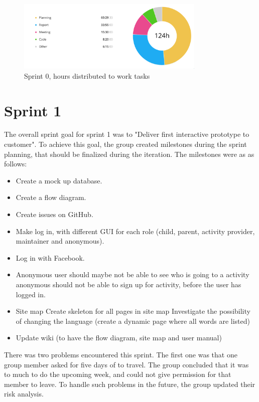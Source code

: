 \begin{figure}[h!]
\centering
    \includegraphics[width=0.8\textwidth]{fig/sprint0-diagram}
\caption{Sprint 0, hours distributed to work tasks}
\end{figure}



\section{Sprint 1}
The overall sprint goal for sprint 1 was to "Deliver first interactive prototype to customer". To achieve this goal, the group created milestones during the sprint planning, that should be finalized during the iteration. The milestones were as as follows: 
\begin{itemize}
  \item Create a mock up database.
  \item Create a flow diagram.
  \item Create issues on GitHub.
  \item Make log in, with different GUI for each role (child, parent, activity      provider, maintainer and anonymous).
  \item Log in with Facebook.
  \item Anonymous user should maybe not be able to see who is going to a activity anonymous should not be able to sign up for activity, before the user has logged in.
  \item  Site map Create skeleton for all pages in site map Investigate the possibility of changing the language (create a dynamic page where all words are listed)
  \item Update wiki (to have the flow diagram, site map and user manual)
\end{itemize}
 
There was two problems encountered this sprint. The first one was that one group member asked for five days of to travel. The group concluded that it was to much to do the upcoming week, and could not give permission for that member to leave. To handle such problems in the future, the group updated their risk analysis. 

